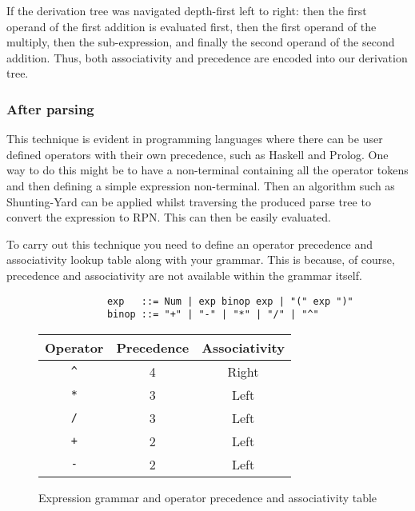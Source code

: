\documentclass[12pt, letterpaper]{article}
\theoremstyle{definition}
\begin{document}
If the derivation tree was navigated depth-first left to right: then the first operand of the first addition is evaluated first, then the first operand of the multiply, then the sub-expression, and finally the second operand of the second addition. Thus, both associativity and precedence are encoded into our derivation tree.\textsuperscript{\cite{lam_2019}}

\subsubsection{After parsing}

This technique is evident in programming languages where there can be user defined operators with their own precedence, such as Haskell and Prolog. One way to do this might be to have a non-terminal containing all the operator tokens and then defining a simple expression non-terminal. Then an algorithm such as Shunting-Yard can be applied whilst traversing the produced parse tree to convert the expression to RPN. This can then be easily evaluated.

To carry out this technique you need to define an operator precedence and associativity lookup table along with your grammar. This is because, of course, precedence and associativity are not available within the grammar itself.

\begin{figure}[H]
    \begin{center}
        \begin{verbatim}
            exp   ::= Num | exp binop exp | "(" exp ")"
            binop ::= "+" | "-" | "*" | "/" | "^"
        \end{verbatim}
        \vspace{1em}
        \begin{tabular}{| c | c | c |}
            \hline
            Operator & Precedence & Associativity\\
            \hline
            \verb|^| & 4 & Right\\
            \hline
            \verb|*| & 3 & Left\\
            \hline
            \verb|/| & 3 & Left\\
            \hline
            \verb|+| & 2 & Left\\
            \hline
            \verb|-| & 2 & Left\\
            \hline
        \end{tabular}
    \end{center}
    \vspace{-1em}
    \caption{Expression grammar and operator precedence and associativity table}
\end{figure}
\end{document}

